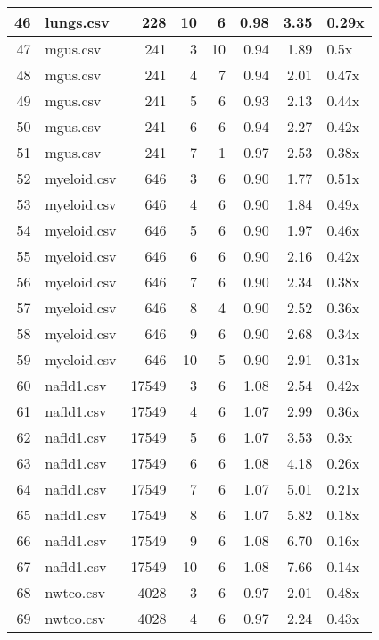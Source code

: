 \begin{table}[ht]
\begin{tabular}{rlrrrrrl}
   \hline
46 & lungs.csv & 228 &  10 &   6 & 0.98 & 3.35 & 0.29x \\ 
   \hline
47 & mgus.csv & 241 &   3 &  10 & 0.94 & 1.89 & 0.5x \\ 
   \hline
48 & mgus.csv & 241 &   4 &   7 & 0.94 & 2.01 & 0.47x \\ 
   \hline
49 & mgus.csv & 241 &   5 &   6 & 0.93 & 2.13 & 0.44x \\ 
   \hline
50 & mgus.csv & 241 &   6 &   6 & 0.94 & 2.27 & 0.42x \\ 
   \hline
51 & mgus.csv & 241 &   7 &   1 & 0.97 & 2.53 & 0.38x \\ 
   \hline
52 & myeloid.csv & 646 &   3 &   6 & 0.90 & 1.77 & 0.51x \\ 
   \hline
53 & myeloid.csv & 646 &   4 &   6 & 0.90 & 1.84 & 0.49x \\ 
   \hline
54 & myeloid.csv & 646 &   5 &   6 & 0.90 & 1.97 & 0.46x \\ 
   \hline
55 & myeloid.csv & 646 &   6 &   6 & 0.90 & 2.16 & 0.42x \\ 
   \hline
56 & myeloid.csv & 646 &   7 &   6 & 0.90 & 2.34 & 0.38x \\ 
   \hline
57 & myeloid.csv & 646 &   8 &   4 & 0.90 & 2.52 & 0.36x \\ 
   \hline
58 & myeloid.csv & 646 &   9 &   6 & 0.90 & 2.68 & 0.34x \\ 
   \hline
59 & myeloid.csv & 646 &  10 &   5 & 0.90 & 2.91 & 0.31x \\ 
   \hline
60 & nafld1.csv & 17549 &   3 &   6 & 1.08 & 2.54 & 0.42x \\ 
   \hline
61 & nafld1.csv & 17549 &   4 &   6 & 1.07 & 2.99 & 0.36x \\ 
   \hline
62 & nafld1.csv & 17549 &   5 &   6 & 1.07 & 3.53 & 0.3x \\ 
   \hline
63 & nafld1.csv & 17549 &   6 &   6 & 1.08 & 4.18 & 0.26x \\ 
   \hline
64 & nafld1.csv & 17549 &   7 &   6 & 1.07 & 5.01 & 0.21x \\ 
   \hline
65 & nafld1.csv & 17549 &   8 &   6 & 1.07 & 5.82 & 0.18x \\ 
   \hline
66 & nafld1.csv & 17549 &   9 &   6 & 1.08 & 6.70 & 0.16x \\ 
   \hline
67 & nafld1.csv & 17549 &  10 &   6 & 1.08 & 7.66 & 0.14x \\ 
   \hline
68 & nwtco.csv & 4028 &   3 &   6 & 0.97 & 2.01 & 0.48x \\ 
   \hline
69 & nwtco.csv & 4028 &   4 &   6 & 0.97 & 2.24 & 0.43x \\ 

\end{tabular}
\end{table}
